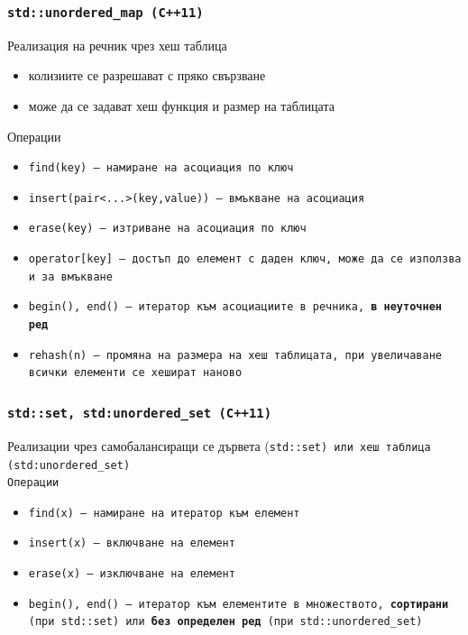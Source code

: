 \documentclass[alsotrans]{beamerswitch}
\begin{document}
\begin{frame}
  \frametitle{\tt{std::unordered\_map} (C++11)}
  Реализация на речник чрез хеш таблица
  \begin{itemize}
  \item колизиите се разрешават с пряко свързване
  \item може да се задават хеш функция и размер на таблицата
  \end{itemize}
  Операции
  \begin{itemize}
  \item \tt{find(key)} --- намиране на асоциация по ключ
  \item \tt{insert(pair<...>(key,value))} --- вмъкване на асоциация
  \item \tt{erase(key)} --- изтриване на асоциация по ключ
  \item \tt{operator[key]} --- достъп до елемент с даден ключ, може да се използва и за вмъкване
  \item \tt{begin(), end()} --- итератор към асоциациите в речника, \textbf{в неуточнен ред}
  \item \tt{rehash(n)} --- промяна на размера на хеш таблицата, при увеличаване всички елементи се хешират наново
  \end{itemize}
\end{frame}


\begin{frame}
  \frametitle{\tt{std::set}, \tt{std:unordered\_set} (C++11)}
  Реализации чрез самобалансиращи се дървета (\tt{std::set}) или хеш таблица (\tt{std:unordered\_set})\\[1ex]
  Операции
  \begin{itemize}
  \item \tt{find(x)} --- намиране на итератор към елемент
  \item \tt{insert(x)} --- включване на елемент
  \item \tt{erase(x)} --- изключване на елемент
  \item \tt{begin(), end()} --- итератор към елементите в множеството, \textbf{сортирани} (при \tt{std::set}) или \textbf{без определен ред} (при \tt{std::unordered\_set})
  \end{itemize}
\end{frame}
\end{document}
